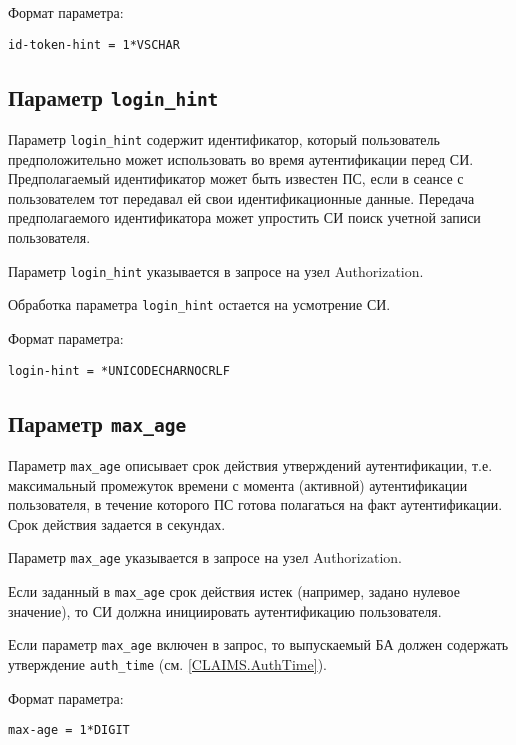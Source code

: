 Формат параметра:
\begin{lstlisting}
id-token-hint = 1*VSCHAR
\end{lstlisting}

\subsection{Параметр \lstinline{login_hint}}\label{PARAMS.LoginHint}

Параметр \lstinline{login_hint} содержит идентификатор, который пользователь 
предположительно может использовать во время аутентификации перед СИ. 
%
Предполагаемый идентификатор может быть известен ПС, если в сеансе с 
пользователем тот передавал ей свои идентификационные данные.
%
Передача предполагаемого идентификатора может упростить СИ поиск учетной записи 
пользователя.

Параметр \lstinline{login_hint} указывается в запросе на узел Authorization.

Обработка параметра \lstinline{login_hint} остается на усмотрение СИ.

Формат параметра:
\begin{lstlisting}
login-hint = *UNICODECHARNOCRLF
\end{lstlisting}

\subsection{Параметр \lstinline{max_age}}\label{PARAMS.MaxAge} 

Параметр \lstinline{max_age} описывает срок действия утверждений
аутентификации, т.е. максимальный промежуток времени с момента (активной)
аутентификации пользователя, в течение которого ПС готова полагаться на факт
аутентификации.
%
Срок действия задается в секундах.

Параметр \lstinline{max_age} указывается в запросе на узел Authorization.

Если заданный в \lstinline{max_age} срок действия истек (например, задано 
нулевое значение), то СИ должна инициировать аутентификацию пользователя.

Если параметр \lstinline{max_age} включен в запрос, то выпускаемый БА должен 
содержать утверждение \lstinline{auth_time} (см. \ref{CLAIMS.AuthTime}).

Формат параметра:
\begin{lstlisting}
max-age = 1*DIGIT
\end{lstlisting}

